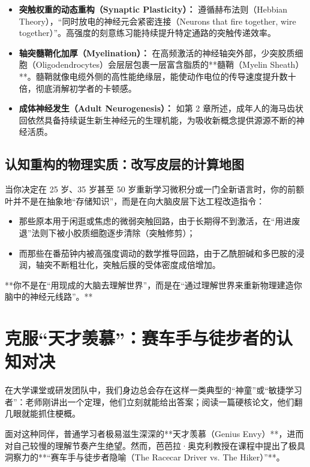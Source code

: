\documentclass[12pt,a4paper,openany]{ctexbook}
\begin{document}
\begin{keypoint}[神经可塑性的三大生理支柱]
\begin{itemize}
    \item \textbf{突触权重的动态重构（Synaptic Plasticity）：} 遵循赫布法则（Hebbian Theory），“同时放电的神经元会紧密连接（Neurons that fire together, wire together）”。高强度的刻意练习能持续提升特定通路的突触传递效率。
    \item \textbf{轴突髓鞘化加厚（Myelination）：} 在高频激活的神经轴突外部，少突胶质细胞（Oligodendrocytes）会层层包裹一层富含脂质的**髓鞘（Myelin Sheath）**。髓鞘就像电缆外侧的高性能绝缘层，能使动作电位的传导速度提升数十倍，彻底消解初学者的卡顿感。
    \item \textbf{成体神经发生（Adult Neurogenesis）：} 如第 2 章所述，成年人的海马齿状回依然具备持续诞生新生神经元的生理机能，为吸收新概念提供源源不断的神经活质。
\end{itemize}
\end{keypoint}

\subsection*{认知重构的物理实质：改写皮层的计算地图}

当你决定在 25 岁、35 岁甚至 50 岁重新学习微积分或一门全新语言时，你的前额叶并不是在抽象地“存储知识”，而是在向大脑皮层下达工程改造指令：
\begin{itemize}
    \item 那些原本用于闲逛或焦虑的微弱突触回路，由于长期得不到激活，在“用进废退”法则下被小胶质细胞逐步清除（突触修剪）；
    \item 而那些在番茄钟内被高强度调动的数学推导回路，由于乙酰胆碱和多巴胺的浸润，轴突不断粗壮化，突触后膜的受体密度成倍增加。
\end{itemize}
**你不是在“用现成的大脑去理解世界”，而是在“通过理解世界来重新物理建造你脑中的神经元线路”。**

\section{克服“天才羡慕”：赛车手与徒步者的认知对决}

在大学课堂或研发团队中，我们身边总会存在这样一类典型的“神童”或“敏捷学习者”：老师刚讲出一个定理，他们立刻就能给出答案；阅读一篇硬核论文，他们翻几眼就能抓住梗概。

面对这种同伴，普通学习者极易滋生深深的**天才羡慕（Genius Envy）**，进而对自己较慢的理解节奏产生绝望。然而，芭芭拉·奥克利教授在课程中提出了极具洞察力的**“赛车手与徒步者隐喻（The Racecar Driver vs. The Hiker）”**。
\end{document}
